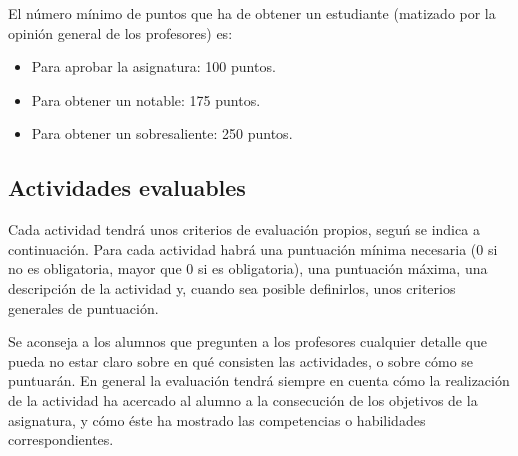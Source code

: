 \documentclass[a4paper,12pt]{article}
\begin{document}
El número mínimo de puntos que ha de obtener un estudiante (matizado por la opinión general de los profesores) es:

\begin{itemize}
\item Para aprobar la asignatura: 100 puntos.
\item Para obtener un notable: 175 puntos.
\item Para obtener un sobresaliente: 250 puntos.
\end{itemize}

\subsection{Actividades evaluables}

Cada actividad tendrá unos criterios de evaluación propios, seguń se indica a continuación. Para cada actividad habrá una puntuación mínima necesaria (0 si no es obligatoria, mayor que 0 si es obligatoria), una puntuación máxima, una descripción de la actividad y, cuando sea posible definirlos, unos criterios generales de puntuación.

Se aconseja a los alumnos que pregunten a los profesores cualquier detalle que pueda no estar claro sobre en qué consisten las actividades, o sobre cómo se puntuarán. En general la evaluación tendrá siempre en cuenta cómo la realización de la actividad ha acercado al alumno a la consecución de los objetivos de la asignatura, y cómo éste ha mostrado las competencias o habilidades correspondientes.
\end{document}
